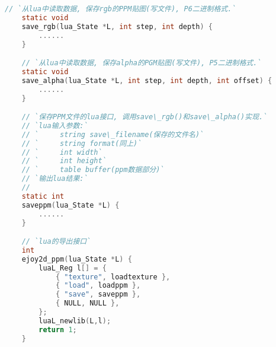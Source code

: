 {\begin{lstlisting}[language=C]
    // `从lua中读取数据, 保存rgb的PPM贴图(写文件), P6二进制格式.`
    static void
    save_rgb(lua_State *L, int step, int depth) {
        ......
    }

    // `从lua中读取数据, 保存alpha的PGM贴图(写文件), P5二进制格式.`
    static void
    save_alpha(lua_State *L, int step, int depth, int offset) {
        ......
    }

    // `保存PPM文件的lua接口, 调用save\_rgb()和save\_alpha()实现.`
    // `lua输入参数:`
    // `     string save\_filename(保存的文件名)`
    // `     string format(同上)`
    // `     int width`
    // `     int height`
    // `     table buffer(ppm数据部分)`
    // `输出lua结果:`
    //
    static int
    saveppm(lua_State *L) {
        ......
    }

    // `lua的导出接口`
    int
    ejoy2d_ppm(lua_State *L) {
        luaL_Reg l[] = {
            { "texture", loadtexture },
            { "load", loadppm },
            { "save", saveppm },
            { NULL, NULL },
        };
        luaL_newlib(L,l);
        return 1;
    }

    \end{lstlisting}
}


